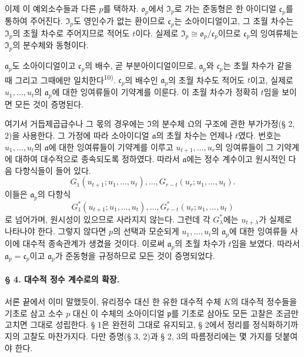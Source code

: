 이제 이 예외소수들과 다른 \(p\)를 택하자. \(\mathfrak o_p\)에서 \(\mathfrak I_p\)로 가는 준동형은 한 아이디얼 \(\mathfrak c_p\)를 통하여 주어진다. \(\mathfrak I_p\)도 영인수가 없는 환이므로 \(\mathfrak c_p\)는 소아이디얼이고, 그 초월 차수는 \(\mathfrak I_p\)의 초월 차수로 주어지므로 적어도 \(t\)이다. 실제로 \(\mathfrak I_p\cong\mathfrak o_p/\mathfrak c_p\)이므로 \(\mathfrak c_p\)의 잉여류체는 \(\mathfrak I_p\)의 분수체와 동형이다.

\(\mathfrak a_p\)도 소아이디얼이고 \(\mathfrak c_p\)의 배수, 곧 부분아이디얼이므로, \(\mathfrak a_p\)와 \(\mathfrak c_p\)는 초월 차수가 같을 때 그리고 그때에만 일치한다\textsuperscript{10)}. \(\mathfrak c_p\)의 배수인 \(\mathfrak a_p\)의 초월 차수도 적어도 \(t\)이고, 실제로 \(u_1,\ldots,u_t\)의 \(\mathfrak a_p\)에 대한 잉여류들이 기약계를 이룬다. 이 초월 차수가 정확히 \(t\)임을 보이면 모든 것이 증명된다.

여기서 거듭제곱급수나 그 몫의 경우에는 \(\mathfrak I\)의 분수체 \(\mathfrak Q\)의 구조에 관한 부가가정(§ 2, 2)을 사용한다. 그 가정에 따라 소아이디얼 \(\mathfrak a\)의 초월 차수는 언제나 \(t\)였다. 번호는 \(u_1,\ldots,u_t\)의 \(\mathfrak a\)에 대한 잉여류들이 기약계를 이루고 \(u_{t+1},\ldots,u_r\)의 잉여류들이 그 기약계에 대하여 대수적으로 종속되도록 정하였다. 따라서 \(\mathfrak a\)에는 정수 계수이고 원시적인 다음 다항식들이 들어 있다.
\[
G_1(u_{t+1};u_1,\ldots,u_t),\ldots,
G_{r-t}(u_r;u_1,\ldots,u_t). \tag{1}
\]
이들은 \(\mathfrak a_p\)의 다항식
\[
G^*_1(u_{t+1};u_1,\ldots,u_t),\ldots,
G^*_{r-t}(u_r;u_1,\ldots,u_t) \tag{2}
\]
로 넘어가며, 원시성이 있으므로 사라지지 않는다. 그런데 각 \(G^*_\lambda\)에는 \(u_{t+\lambda}\)가 실제로 나타나야 한다. 그렇지 않다면 \(p\)의 선택과 모순되게 \(u_1,\ldots,u_t\)의 \(\mathfrak a_p\)에 대한 잉여류들 사이에 대수적 종속관계가 생겼을 것이다. 이로써 \(\mathfrak a_p\)의 초월 차수가 \(t\)임을 보였다. 따라서 \(\mathfrak a_p=\mathfrak c_p\)이고 \(\mathfrak a_p\)가 준동형을 규정하므로 모든 것이 증명되었다.

\bigskip
\paragraph{§ 4. 대수적 정수 계수로의 확장.}

서론 끝에서 이미 말했듯이, 유리정수 대신 한 유한 대수적 수체 \(K\)의 대수적 정수들을 기초로 삼고 소수 \(p\) 대신 이 수체의 소아이디얼 \(\mathfrak p\)를 기초로 삼아도 모든 고찰은 조금만 고치면 그대로 성립한다. § 1은 완전히 그대로 유지되고, § 2에서 정리를 정식화하기까지의 고찰도 마찬가지다. 다만 증명(§ 3, 2)과 § 2, 3의 따름정리에는 몇 가지를 덧붙여야 한다.

